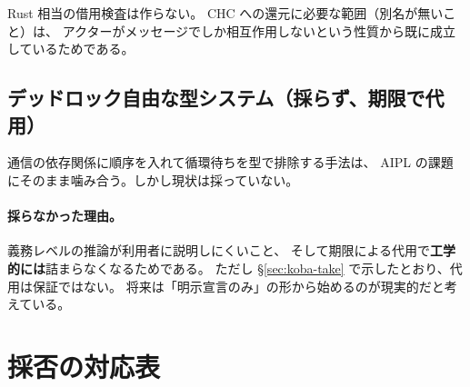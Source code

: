\documentclass[11pt,a4paper]{ltjsarticle}
\theoremstyle{definition}
\theoremstyle{remark}
\begin{document}
Rust 相当の借用検査は作らない。
CHC への還元に必要な範囲（別名が無いこと）は、
アクターがメッセージでしか相互作用しないという性質から既に成立しているためである。

\subsection{デッドロック自由な型システム（採らず、期限で代用）}

通信の依存関係に順序を入れて循環待ちを型で排除する手法は、
AIPL の課題にそのまま噛み合う。しかし現状は採っていない。

\paragraph{採らなかった理由。}
義務レベルの推論が利用者に説明しにくいこと、
そして期限による代用で\textbf{工学的には}詰まらなくなるためである。
ただし \S\ref{sec:koba-take} で示したとおり、代用は保証ではない。
将来は「明示宣言のみ」の形から始めるのが現実的だと考えている。

\section{採否の対応表}
\label{sec:table}
\end{document}

